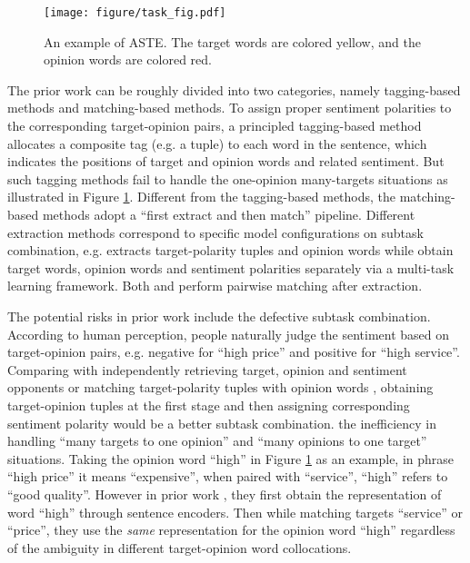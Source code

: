\documentclass[11pt]{article}
\begin{document}
\begin{figure}[t]
    \centering
    \texttt{[image: figure/task\_fig.pdf]}
    \caption{An example of ASTE. The target words are colored yellow, and the opinion words are colored red.}
    \label{fig:data_fig}
\end{figure}

The prior work can be roughly divided into two categories, namely tagging-based methods and matching-based methods.
To assign proper sentiment polarities to the corresponding target-opinion pairs, a principled tagging-based method \cite{xu2020position} allocates a composite tag (e.g. a tuple) to each word in the sentence, which indicates the positions of target and opinion words and related sentiment. 
But such tagging methods fail to handle the one-opinion many-targets situations as illustrated in Figure \ref{fig:data_fig}. 
Different from the tagging-based methods, 
the matching-based methods adopt a ``first extract and then match'' pipeline.
Different extraction methods correspond to specific model configurations on subtask combination, e.g.
\citet{peng2020knowing} extracts target-polarity tuples and opinion words while \citet{zhang2020multi} obtain target words, opinion words and sentiment polarities separately via a multi-task learning framework.
Both \citet{peng2020knowing} and \citet{zhang2020multi} perform pairwise matching after extraction.

The potential risks in prior work include  the defective subtask combination. According to human perception, people naturally judge the sentiment based on target-opinion pairs, e.g. negative for ``high price'' and positive for ``high service''. Comparing with independently retrieving target, opinion and sentiment opponents \cite{zhang2020multi} or matching target-polarity tuples with opinion words \cite{peng2020knowing}, obtaining target-opinion tuples at the first stage and then assigning corresponding sentiment polarity would be a better subtask combination.
 the inefficiency in handling ``many targets to one opinion'' and ``many opinions to one target'' situations. 
Taking the opinion word ``high'' in Figure \ref{fig:data_fig} as an example, in phrase ``high price'' it means ``expensive'', when paired with ``service'', ``high'' refers to ``good quality''.
However in prior work \cite{peng2020knowing,zhang2020multi}, they first obtain the representation of word ``high'' through 
sentence encoders. 
Then while matching targets ``service'' or ``price'', they use the \textit{same} representation for the opinion word ``high'' regardless of the ambiguity in different target-opinion word collocations.
\end{document}
